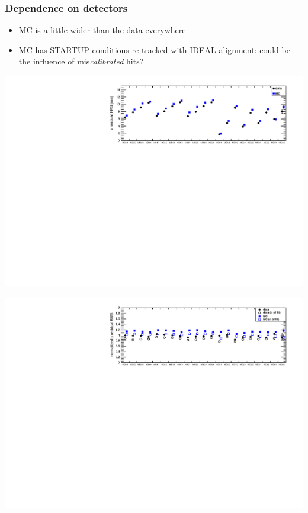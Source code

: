 \documentclass[compress]{beamer}
\begin{document}
\begin{frame}
\frametitle{Dependence on detectors}

\begin{itemize}
\item MC is a little wider than the data everywhere
\item MC has STARTUP conditions re-tracked with IDEAL alignment: could
  be the influence of mis{\it calibrated} hits?
\end{itemize}
\begin{center}
\includegraphics[width=0.9\linewidth]{summaryX.pdf}

\includegraphics[width=0.9\linewidth]{summaryXnorm.pdf}
\end{center}
\end{frame}
\end{document}
